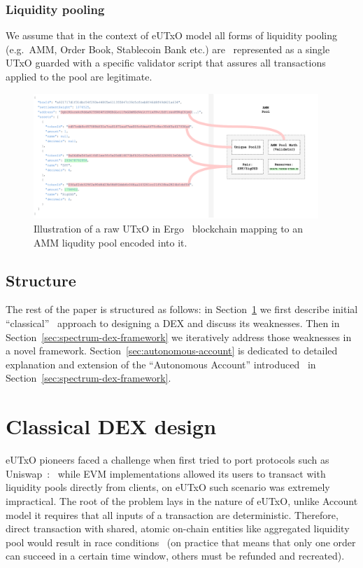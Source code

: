 \documentclass[11pt]{article}
\begin{document}
\begin{sloppypar}
        \subsubsection{Liquidity pooling}
        We assume that in the context of eUTxO model all forms of liquidity pooling (e.g.\ AMM, Order Book, Stablecoin Bank etc.) are \
        represented as a single UTxO guarded with a specific validator script that assures all transactions applied to the pool are legitimate.

        \begin{figure}[h]
            \centering
            \includegraphics[width=0.96\textwidth]{amm-utxo}
            \caption{Illustration of a raw UTxO in Ergo~\cite{ergo2019wp} blockchain mapping to an AMM liqudity pool encoded into it.}
            \label{fig:figure}
        \end{figure}

        \subsection{Structure}\label{subsec:structure}
        The rest of the paper is structured as follows: in Section~\ref{sec:classical-dex-design} we first describe initial \enquote{classical} \
        approach to designing a DEX and discuss its weaknesses.
        Then in Section~\ref{sec:spectrum-dex-framework} we iteratively address those weaknesses in a novel framework.
        Section~\ref{sec:autonomous-account} is dedicated to detailed explanation and extension of the \enquote{Autonomous Account} introduced \
        in Section~\ref{sec:spectrum-dex-framework}.


        \section{Classical DEX design}\label{sec:classical-dex-design}
        eUTxO pioneers faced a challenge when first tried to port protocols such as Uniswap~\cite{uniswap2020evm}: \
        while EVM implementations allowed its users to transact with liquidity pools directly from clients, on eUTxO such scenario was extremely impractical.
        The root of the problem lays in the nature of eUTxO, unlike Account model it requires that all inputs of a transaction are deterministic.
        Therefore, direct transaction with shared, atomic on-chain entities like aggregated liquidity pool would result in race conditions \
        (on practice that means that only one order can succeed in a certain time window, others must be refunded and recreated).


\end{sloppypar}
\end{document}
